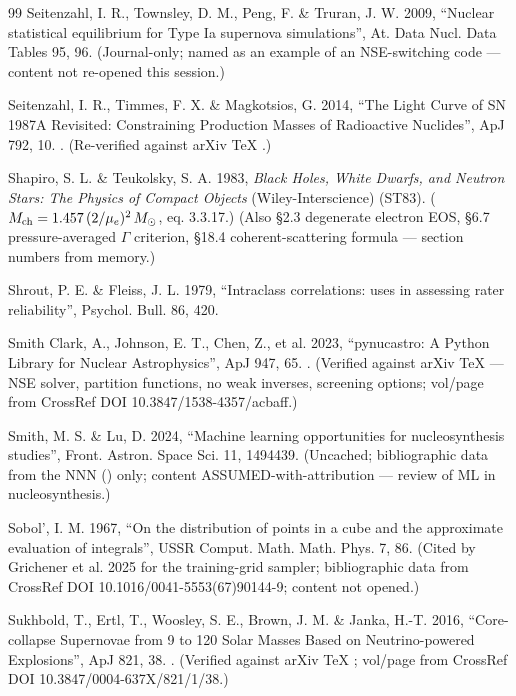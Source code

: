 \begin{thebibliography}{99}
Seitenzahl, I. R., Townsley, D. M., Peng, F. \& Truran, J. W. 2009, ``Nuclear statistical equilibrium for Type Ia supernova simulations'', At. Data Nucl. Data Tables 95, 96. (Journal-only; named as an example of an NSE-switching code --- content not re-opened this session.)

Seitenzahl, I. R., Timmes, F. X. \& Magkotsios, G. 2014, ``The Light Curve of SN 1987A Revisited: Constraining Production Masses of Radioactive Nuclides'', ApJ 792, 10. . (Re-verified against arXiv TeX .)

Shapiro, S. L. \& Teukolsky, S. A. 1983, \emph{Black Holes, White Dwarfs, and Neutron Stars: The Physics of Compact Objects} (Wiley-Interscience) (ST83). ($M_{\mathrm{ch}} = 1.457\,(2/\mu_e)^2\,M_{\odot}$, eq. 3.3.17.) (Also \S 2.3 degenerate electron EOS, \S 6.7 pressure-averaged $\Gamma$ criterion, \S 18.4 coherent-scattering formula --- section numbers from memory.)

Shrout, P. E. \& Fleiss, J. L. 1979, ``Intraclass correlations: uses in assessing rater reliability'', Psychol. Bull. 86, 420.

Smith Clark, A., Johnson, E. T., Chen, Z., et al. 2023, ``pynucastro: A Python Library for Nuclear Astrophysics'', ApJ 947, 65. . (Verified against arXiv TeX  --- NSE solver, partition functions, no weak inverses, screening options; vol/page from CrossRef DOI 10.3847/1538-4357/acbaff.)

Smith, M. S. \& Lu, D. 2024, ``Machine learning opportunities for nucleosynthesis studies'', Front. Astron. Space Sci. 11, 1494439. (Uncached; bibliographic data from the NNN  () only; content ASSUMED-with-attribution --- review of ML in nucleosynthesis.)

Sobol', I. M. 1967, ``On the distribution of points in a cube and the approximate evaluation of integrals'', USSR Comput. Math. Math. Phys. 7, 86. (Cited by Grichener et al. 2025  for the training-grid sampler; bibliographic data from CrossRef DOI 10.1016/0041-5553(67)90144-9; content not opened.)

Sukhbold, T., Ertl, T., Woosley, S. E., Brown, J. M. \& Janka, H.-T. 2016, ``Core-collapse Supernovae from 9 to 120 Solar Masses Based on Neutrino-powered Explosions'', ApJ 821, 38. . (Verified against arXiv TeX ; vol/page from CrossRef DOI 10.3847/0004-637X/821/1/38.)


\end{thebibliography}
